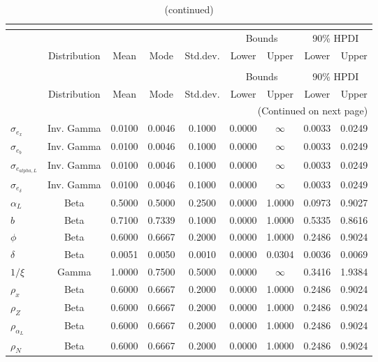  
\begin{center}
\begin{longtable}{lcccccccc} 
\caption{Prior information (parameters)}\\
 \label{Table:Prior}\\
\toprule%
  &  &  &  &  & \multicolumn{2}{c}{Bounds} & \multicolumn{2}{c}{90\% HPDI} \\ 
  \cmidrule(r{.75em}){6-7} \cmidrule(r{.75em}){8-9}
  & Distribution & Mean & Mode & Std.dev. & Lower & Upper & Lower & Upper  \\ 
\midrule
\endfirsthead
\caption{(continued)}\\
 \toprule%
  &  &  &  &  & \multicolumn{2}{c}{Bounds} & \multicolumn{2}{c}{90\% HPDI} \\ 
  \cmidrule(r{.75em}){6-7} \cmidrule(r{.75em}){8-9}
  & Distribution & Mean & Mode & Std.dev. & Lower & Upper & Lower & Upper  \\ 
\midrule
\endhead
\midrule
\multicolumn{9}{r}{(Continued on next page)} \\ 
\bottomrule
\endfoot
\bottomrule
\endlastfoot
$ \sigma_{{e_x}} $ & Inv. Gamma & 0.0100 & 0.0046 & 0.1000 & 0.0000 & $\infty$ & 0.0033 & 0.0249 \\ 
$ \sigma_{{e_{b}}} $ & Inv. Gamma & 0.0100 & 0.0046 & 0.1000 & 0.0000 & $\infty$ & 0.0033 & 0.0249 \\ 
$ \sigma_{{e_{alpha,L}}} $ & Inv. Gamma & 0.0100 & 0.0046 & 0.1000 & 0.0000 & $\infty$ & 0.0033 & 0.0249 \\ 
$ \sigma_{{e_{\delta}}} $ & Inv. Gamma & 0.0100 & 0.0046 & 0.1000 & 0.0000 & $\infty$ & 0.0033 & 0.0249 \\ 
$ \alpha_L $ & Beta & 0.5000 & 0.5000 & 0.2500 & 0.0000 & 1.0000 & 0.0973 & 0.9027 \\ 
$ b $ & Beta & 0.7100 & 0.7339 & 0.1000 & 0.0000 & 1.0000 & 0.5335 & 0.8616 \\ 
$ \phi $ & Beta & 0.6000 & 0.6667 & 0.2000 & 0.0000 & 1.0000 & 0.2486 & 0.9024 \\ 
$ {\delta} $ & Beta & 0.0051 & 0.0050 & 0.0010 & 0.0000 & 0.0304 & 0.0036 & 0.0069 \\ 
$ {1/\xi} $ & Gamma & 1.0000 & 0.7500 & 0.5000 & 0.0000 & $\infty$ & 0.3416 & 1.9384 \\ 
$ {\rho_x} $ & Beta & 0.6000 & 0.6667 & 0.2000 & 0.0000 & 1.0000 & 0.2486 & 0.9024 \\ 
$ {\rho_Z} $ & Beta & 0.6000 & 0.6667 & 0.2000 & 0.0000 & 1.0000 & 0.2486 & 0.9024 \\ 
$ {\rho_{\alpha_L}} $ & Beta & 0.6000 & 0.6667 & 0.2000 & 0.0000 & 1.0000 & 0.2486 & 0.9024 \\ 
$ {\rho_N} $ & Beta & 0.6000 & 0.6667 & 0.2000 & 0.0000 & 1.0000 & 0.2486 & 0.9024 \\ 
\end{longtable}
 \end{center}
